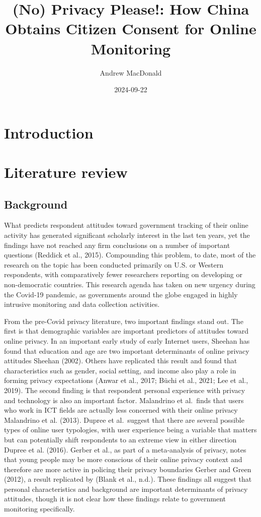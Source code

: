 \documentclass[
  letterpaper,
  DIV=11,
  numbers=noendperiod]{scrartcl}
\title{(No) Privacy Please!: How China Obtains Citizen Consent for
Online Monitoring}
\author{Andrew MacDonald}
\date{2024-09-22}
\begin{document}
\maketitle

\section{Introduction}\label{sec-introduction}

\section{Literature review}\label{sec-litreview}

\subsection{Background}\label{background}

What predicts respondent attitudes toward government tracking of their
online activity has generated significant scholarly interest in the last
ten years, yet the findings have not reached any firm conclusions on a
number of important questions (Reddick et al., 2015). Compounding this
problem, to date, most of the research on the topic has been conducted
primarily on U.S. or Western respondents, with comparatively fewer
researchers reporting on developing or non-democratic countries. This
research agenda has taken on new urgency during the Covid-19 pandemic,
as governments around the globe engaged in highly intrusive monitoring
and data collection activities.

From the pre-Covid privacy literature, two important findings stand out.
The first is that demographic variables are important predictors of
attitudes toward online privacy. In an important early study of early
Internet users, Sheehan has found that education and age are two
important determinants of online privacy attitudes Sheehan (2002).
Others have replicated this result and found that characteristics such
as gender, social setting, and income also play a role in forming
privacy expectations (Anwar et al., 2017; Büchi et al., 2021; Lee et
al., 2019). The second finding is that respondent personal experience
with privacy and technology is also an important factor. Malandrino et
al.~finds that users who work in ICT fields are actually less concerned
with their online privacy Malandrino et al. (2013). Dupree et
al.~suggest that there are several possible types of online user
typologies, with user experience being a variable that matters but can
potentially shift respondents to an extreme view in either direction
Dupree et al. (2016). Gerber et al., as part of a meta-analysis of
privacy, notes that young people may be more conscious of their online
privacy context and therefore are more active in policing their privacy
boundaries Gerber and Green (2012), a result replicated by (Blank et
al., n.d.). These findings all suggest that personal characteristics and
background are important determinants of privacy attitudes, though it is
not clear how these findings relate to government monitoring
specifically.
\end{document}
